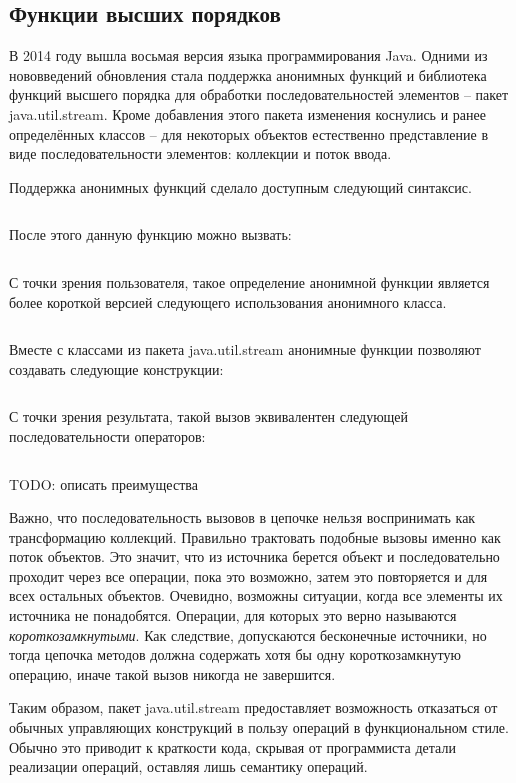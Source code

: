 \subsection{Функции высших порядков} %
В 2014 году вышла восьмая версия языка программирования Java. Одними из нововведений обновления 
стала поддержка анонимных функций и библиотека функций высшего порядка для обработки 
последовательностей элементов -- пакет java.util.stream. Кроме добавления этого пакета 
изменения коснулись и ранее определённых классов -- для некоторых объектов естественно 
представление в виде последовательности элементов: коллекции и поток ввода.

Поддержка анонимных функций сделало доступным следующий синтаксис.
\inputminted{java}{chapter1/code/Lambda.java}

После этого данную функцию можно вызвать:
\inputminted{java}{chapter1/code/UseLambda.java}

С точки зрения пользователя, такое определение анонимной функции является более короткой версией следующего использования анонимного класса.

\inputminted{java}{chapter1/code/SameAnonymous.java}

Вместе с классами из пакета java.util.stream анонимные функции позволяют создавать следующие конструкции:

\inputminted{java}{chapter1/code/StreamUsage.java}

С точки зрения результата, такой вызов эквивалентен следующей последовательности операторов: 

\inputminted{java}{chapter1/code/CyclesUsage.java}

TODO: описать преимущества

Важно, что последовательность вызовов в цепочке нельзя воспринимать как трансформацию коллекций. Правильно трактовать подобные вызовы именно как поток объектов. Это значит, что из источника берется объект и последовательно проходит через все операции, пока это возможно, затем это повторяется и для всех остальных объектов. Очевидно, возможны ситуации, когда все элементы их источника не понадобятся. Операции, для которых это верно называются \textit{короткозамкнутыми}. Как следствие, допускаются бесконечные источники, но тогда цепочка методов должна содержать хотя бы одну короткозамкнутую операцию, иначе такой вызов никогда не завершится.

Таким образом, пакет java.util.stream предоставляет возможность отказаться от обычных управляющих конструкций в пользу операций в функциональном стиле. Обычно это приводит к краткости кода, скрывая от программиста детали реализации операций, оставляя лишь семантику операций.

